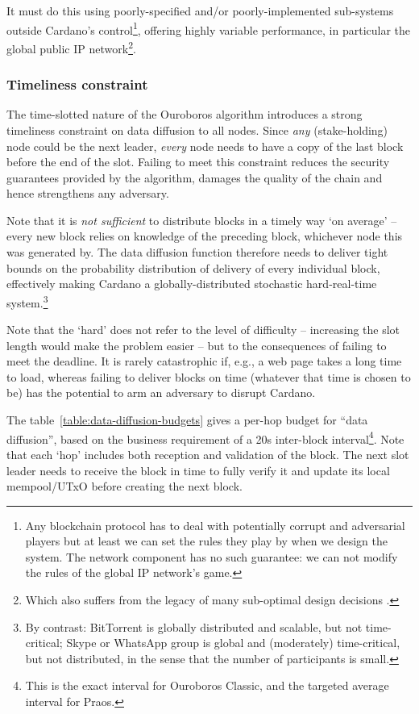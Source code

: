 \documentclass[11pt,a4paper]{article}
\begin{document}
It must do this using poorly-specified and/or poorly-implemented
sub-systems outside Cardano's control\footnote{Any blockchain protocol
  has to deal with potentially corrupt and adversarial players but at
  least we can set the rules they play by when we design the system. The
  network component has no such guarantee: we can not modify the rules
  of the global IP network's game.}, offering highly variable
performance, in particular the global public IP network\footnote{Which
  also suffers from the legacy of many sub-optimal design decisions
  \cite{JD08}.}.

\subsubsection{Timeliness constraint}
\label{timeliness-constraint}

The time-slotted nature of the Ouroboros algorithm introduces a strong
timeliness constraint on data diffusion to all nodes. Since \emph{any}
(stake-holding) node could be the next leader, \emph{every} node needs
to have a copy of the last block before the end of the slot. Failing to
meet this constraint reduces the security guarantees provided by the
algorithm, damages the quality of the chain and hence strengthens any
adversary.

Note that it is \emph{not sufficient} to distribute blocks in a timely
way `on average' -- every new block relies on knowledge of the preceding
block, whichever node this was generated by. The data diffusion function
therefore needs to deliver tight bounds on the probability distribution
of delivery of every individual block, effectively making Cardano a
globally-distributed stochastic hard-real-time system.\footnote{By
  contrast: BitTorrent is globally distributed and scalable, but not
  time-critical; Skype or WhatsApp group is global and (moderately)
  time-critical, but not distributed, in the sense that the number of
  participants is small.}

Note that the `hard' does not refer to the level of difficulty --
increasing the slot length would make the problem easier -- but to the
consequences of failing to meet the deadline. It is rarely catastrophic
if, e.g., a web page takes a long time to load, whereas failing to
deliver blocks on time (whatever that time is chosen to be) has the
potential to arm an adversary to disrupt Cardano.

The table~\ref{table:data-diffusion-budgets} gives a per-hop budget for ``data
diffusion'', based on the business requirement of a 20s inter-block
interval\footnote{This is the exact interval for Ouroboros Classic, and the
targeted average interval for Praos.}. Note that each `hop' includes both
reception and validation of the block. The next slot leader needs to receive
the block in time to fully verify it and update its local mempool/UTxO before
creating the next block.
\end{document}
